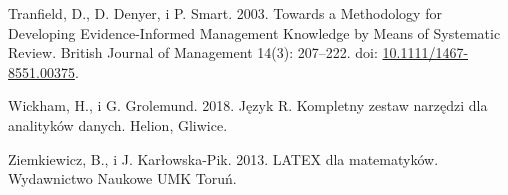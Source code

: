 \documentclass[
  12pt,
]{article}
\newlength{\cslhangindent}
\newlength{\cslentryspacingunit} %
\newenvironment{CSLReferences}[2] %
 {%
  \setlength{\parindent}{0pt}
  \ifodd #1
  \let\oldpar\par
  \def\par{\hangindent=\cslhangindent\oldpar}
  \fi
  \setlength{\parskip}{#2\cslentryspacingunit}
 }%
 {}
\begin{document}
\begin{CSLReferences}{1}{0}
\leavevmode{}%
Tranfield, D., D. Denyer, i P. Smart. 2003. Towards a Methodology for
Developing Evidence-Informed Management Knowledge by Means of Systematic
Review. British Journal of Management 14(3): 207--222. doi:
\href{https://doi.org/10.1111/1467-8551.00375}{10.1111/1467-8551.00375}.

\leavevmode{}%
Wickham, H., i G. Grolemund. 2018. J{ę}zyk R. Kompletny zestaw
narz{ę}dzi dla analityków danych. Helion, Gliwice.

\leavevmode{}%
Ziemkiewicz, B., i J. Karłowska-Pik. 2013. LATEX dla matematyków.
Wydawnictwo Naukowe UMK Toru{ń}.

\end{CSLReferences}

\FloatBarrier
\newpage
{}
\listoffigures
{}
\end{document}

